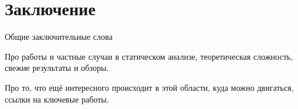 ﻿\chapter{Заключение}

Общие заключительные слова

Про работы и частные случаи в статическом анализе, теоретическая сложность, свежие результаты и обзоры.

Про то, что ещё интересного происходит в этой области, куда можно двигаться, ссылки на ключевые работы.
